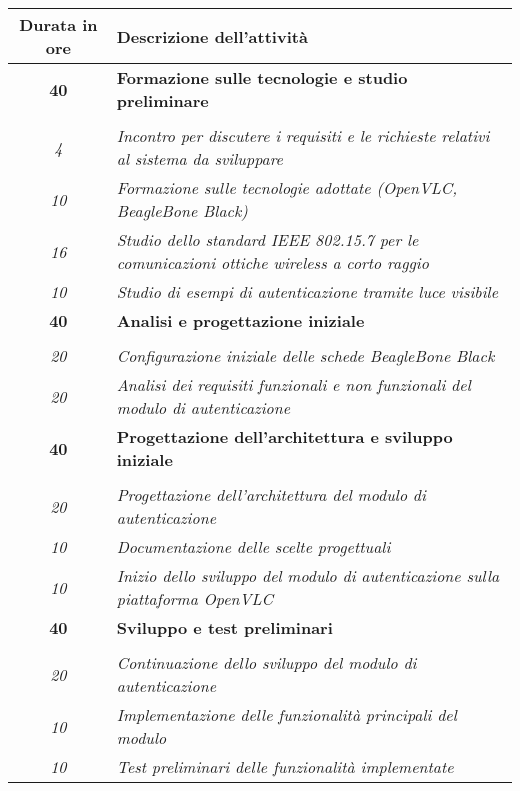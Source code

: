 
\begin{tabularx}{\textwidth}{|c|X|}
    \hline
    \textbf{Durata in ore} & \textbf{Descrizione dell'attività} \\\hline
    
    \textbf{40} & \textbf{Formazione sulle tecnologie e studio preliminare} \\	 
    \hdashline 
    \multirow{4}{0cm}\\ 
    \textit{4} & 
    \textit{Incontro per discutere i requisiti e le richieste relativi al sistema da sviluppare} \\
    \textit{10} & 
    \textit{Formazione sulle tecnologie adottate (OpenVLC, BeagleBone Black)} \\
    \textit{16} & 
    \textit{Studio dello standard IEEE 802.15.7 per le comunicazioni ottiche wireless a corto raggio} \\
    \textit{10} & 
    \textit{Studio di esempi di autenticazione tramite luce visibile} \\
    \hline
    
    \textbf{40} & \textbf{Analisi e progettazione iniziale} \\ \hdashline 
    \multirow{2}{0cm}\\ 
    \textit{20} & 
    \textit{Configurazione iniziale delle schede BeagleBone Black} \\
    \textit{20} & 
    \textit{Analisi dei requisiti funzionali e non funzionali del modulo di autenticazione} \\
    \hline
    
    \textbf{40} & \textbf{Progettazione dell'architettura e sviluppo iniziale} \\ \hdashline 
    \multirow{3}{0cm}\\ 
    \textit{20} & 
    \textit{Progettazione dell'architettura del modulo di autenticazione} \\
    \textit{10} & 
    \textit{Documentazione delle scelte progettuali} \\
    \textit{10} & 
    \textit{Inizio dello sviluppo del modulo di autenticazione sulla piattaforma OpenVLC} \\
    \hline
    
    \textbf{40} & \textbf{Sviluppo e test preliminari} \\ \hdashline 
    \multirow{3}{0cm}\\ 
    \textit{20} & 
    \textit{Continuazione dello sviluppo del modulo di autenticazione} \\
    \textit{10} & 
    \textit{Implementazione delle funzionalità principali del modulo} \\
    \textit{10} & 
    \textit{Test preliminari delle funzionalità implementate} \\
    \hline
    

\end{tabularx}
